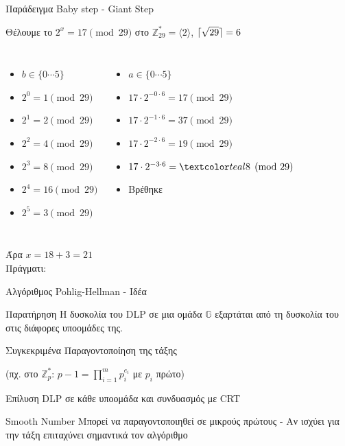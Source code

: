 \documentclass[handout]{beamer}
\DeclarePairedDelimiter{\ceil}{\lceil}{\rceil}
\begin{document}
\begin{frame}{Παράδειγμα Baby step - Giant Step}
\begin{block}{Θέλουμε το $2^x = 17 \pmod{29}$ στο $\mathbb{Z}_{29}^*=\langle 2 \rangle$, $\ceil{\sqrt{29}} = 6$}
\begin{columns}
\begin{itemize}
\item $b \in \{0 \cdots 5\}$
\item $2^{0} = 1  \pmod{29}$
\pause
\item $2^{1} = 2  \pmod{29}$
\pause
\item $2^{2} = 4 \pmod{29}$
\pause
\item $2^{3} = 8  \pmod{29}$
\pause
\item $2^{4} = 16  \pmod{29}$
\pause
\item $2^{5} = 3  \pmod{29}$
\end{itemize}
\pause
{}

\begin{itemize}
\item $a \in \{0 \cdots 5\}$
\item $17 \cdot 2^{-0 \cdot 6} = 17  \pmod{29}$
\pause
\item $17 \cdot 2^{-1 \cdot 6} = 37  \pmod{29}$
\pause
\item $17 \cdot 2^{-2 \cdot 6} = 19  \pmod{29}$
\pause
\item $17 \cdot 2^{-3 \cdot 6} = \green{8}  \pmod{29}$
\item Βρέθηκε
\end{itemize}
\end{columns}
\pause
\begin{center}
Άρα $x = 18+3 = 21$\\
Πράγματι: 
\end{center}
\end{block}

\end{frame}

\begin{frame}{Αλγόριθμος Pohlig-Hellman - Ιδέα}

\begin{block}{Παρατήρηση}
Η δυσκολία του DLP σε μια ομάδα $\mathbb{G}$ εξαρτάται από τη δυσκολία του στις διάφορες υποομάδες της.
\end{block}
\pause
\begin{block}{Συγκεκριμένα}
Παραγοντοποίηση της τάξης 

(πχ. στο $\mathbb{Z}_p^*$: $p-1 = \prod_{i=1}^m p_i^{e_i}$ με $p_i$ πρώτο)

Επίλυση DLP σε κάθε υποομάδα και συνδυασμός με CRT 
\end{block}
\pause
\begin{block}{Smooth Number}
Μπορεί να παραγοντοποιηθεί σε μικρούς πρώτους - Αν ισχύει για την τάξη επιταχύνει σημαντικά τον αλγόριθμο
\end{block}
\end{frame}
\end{document}
